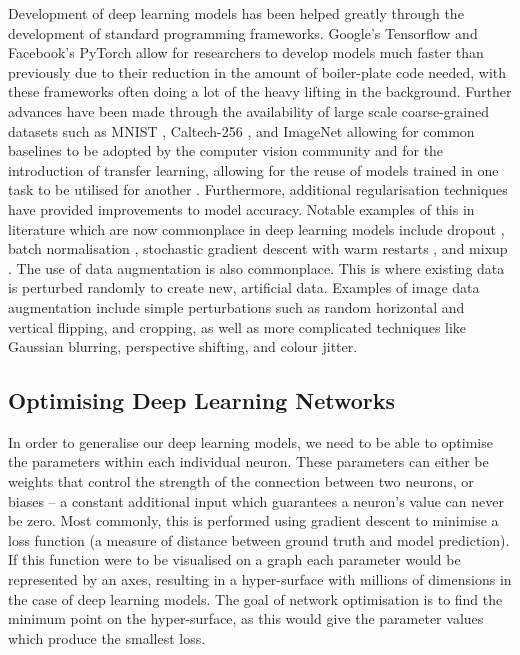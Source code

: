 Development of deep learning models has been helped greatly through the development of standard programming frameworks. Google's Tensorflow \cite{abadi_tensorflow:_2016} and Facebook's PyTorch \cite{paszke_automatic_2017} allow for researchers to develop models much faster than previously due to their reduction in the amount of boiler-plate code needed, with these frameworks often doing a lot of the heavy lifting in the background. Further advances have been made through the availability of large scale coarse-grained datasets such as MNIST \cite{lecun_gradient-based_1998}, Caltech-256 \cite{griffin_caltech-256_2007}, and ImageNet \cite{deng_imagenet:_2009} allowing for common baselines to be adopted by the computer vision community and for the introduction of transfer learning, allowing for the reuse of models trained in one task to be utilised for another \cite{pan_survey_2010}. Furthermore, additional regularisation techniques have provided improvements to model accuracy. Notable examples of this in literature which are now commonplace in deep learning models include dropout \cite{srivastava_dropout:_2014}, batch normalisation \cite{ioffe_batch_2015}, stochastic gradient descent with warm restarts \cite{loshchilov_sgdr:_2016}, and mixup \cite{zhang_mixup:_2017}. The use of data augmentation is also commonplace. This is where existing data is perturbed randomly to create new, artificial data. Examples of image data augmentation include simple perturbations such as random horizontal and vertical flipping, and cropping, as well as more complicated techniques like Gaussian blurring, perspective shifting, and colour jitter.

\subsection{Optimising Deep Learning Networks}\label{ch:Background,sec:DLIntro,sub:stochasticgradientdescent}

In order to generalise our deep learning models, we need to be able to optimise the parameters within each individual neuron. These parameters can either be weights that control the strength of the connection between two neurons, or biases -- a constant additional input which guarantees a neuron's value can never be zero. Most commonly, this is performed using gradient descent to minimise a loss function (a measure of distance between ground truth and model prediction). If this function were to be visualised on a graph each parameter would be represented by an axes, resulting in a hyper-surface with millions of dimensions in the case of deep learning models. The goal of network optimisation is to find the minimum point on the hyper-surface, as this would give the parameter values which produce the smallest loss. 

